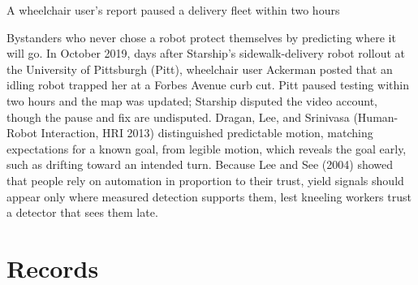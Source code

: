 \documentclass[aspectratio=169, 12pt]{beamer}
\begin{document}
\begin{frame}[t]{A wheelchair user's report paused a delivery fleet within two hours}
{  Bystanders who never chose a robot protect themselves by predicting where it will go. In October 2019, days after Starship's sidewalk-delivery robot rollout at the University of Pittsburgh (Pitt), wheelchair user Ackerman posted that an idling robot trapped her at a Forbes Avenue curb cut. Pitt paused testing within two hours and the map was updated; Starship disputed the video account, though the pause and fix are undisputed. Dragan, Lee, and Srinivasa (Human-Robot Interaction, HRI 2013) distinguished predictable motion, matching expectations for a known goal, from legible motion, which reveals the goal early, such as drifting toward an intended turn. Because Lee and See (2004) showed that people rely on automation in proportion to their trust, yield signals should appear only where measured detection supports them, lest kneeling workers trust a detector that sees them late.


}
\end{frame}

\section{Records}
\end{document}
